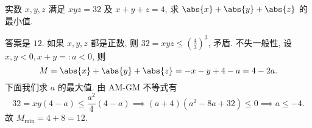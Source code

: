 \begin{prob}
\label{prob:prob-5}
实数 $x, y, z$ 满足 $xyz = 32$ 及 $x + y + z = 4$,
求 $\abs{x} + \abs{y} + \abs{z}$ 的最小值.
\end{prob}

\begin{soln}
答案是 $\boxed{12.}$ 如果 $x, y, z$ 都是正数,
则 $32 = xyz \le (\frac{4}{3})^3$, 矛盾.
不失一般性, 设 $x, y < 0, x + y =: a < 0$, 则
\[
M = \abs{x} + \abs{y} + \abs{z} = -x - y + 4 - a = 4 - 2a.
\]
下面我们求 $a$ 的最大值. 由 AM-GM 不等式有
\[
32 = xy(4-a) \le \frac{a^2}{4}(4-a) \implies
(a+4)(a^2 - 8a + 32) \le 0 \implies a \le -4.
\]
故 $M_{\text{min}} = 4 + 8 = 12$.
\end{soln}
